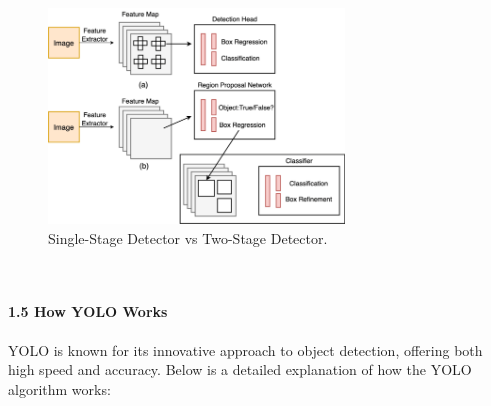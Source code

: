 %
\begin{figure}[h!]
    \centering
    \includegraphics[width=0.7\textwidth]{images/1_vs_2 Stage.png}
    \caption{Single-Stage Detector vs Two-Stage Detector.}
\end{figure}
\\\\
%
{ \textbf{1.5 {How YOLO Works}}}\\\\
%
YOLO is known for its innovative approach to object detection, offering both high speed and accuracy. Below is a detailed explanation of how the YOLO algorithm works:
%

